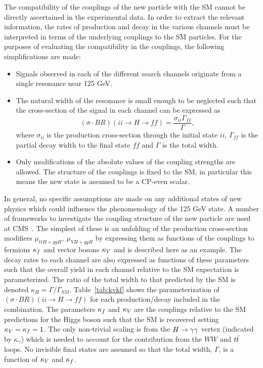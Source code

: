The compatibility of the couplings of the new particle with the SM cannot be directly ascertained 
in the experimental data. In order to extract the relevant information, the rates of production and decay in the various
channels must be interpreted in terms of the underlying couplings to the SM particles.
For the purposes of evaluating the compatibility in the couplings, the following simplifications
are made:
\begin{itemize}
\item Signals observed in each of the different search channels originate from a single
resonance near 125 GeV.
\item The natural width of the resonance is small enough to be neglected such that the 
cross-section of the signal in each channel can be expressed as
\begin{equation}
(\sigma \cdot BR)(ii\rightarrow H\rightarrow ff) 
	= \frac{\displaystyle \sigma_{ii}\Gamma_{ff}}{\displaystyle \Gamma},
\end{equation}
where $\sigma_{ii}$ is the production cross-section through the initial state $ii$, 
$\Gamma_{ff}$ is the partial decay width to the final state $ff$ and $\Gamma$ is the
total width. 
\item Only modifications of the absolute values of the coupling strengths are allowed. 
The structure of the couplings is fixed to the SM, in particular this means the 
new state is assumed to be a CP-even scalar.
\end{itemize}
In general, no specific assumptions are made on any additional states of new physics
which could influence the phenomenology of the 125 GeV state.
A number of frameworks to investigate the coupling structure of the new particle
are used at CMS~\citep{couplingsint}. The simplest of these is an unfolding of the production cross-section
modifiers $\mu_{ttH+ggH},~\mu_{VH+qqH}$ by expressing them as functions of the couplings 
to fermions $\kappa_{f}$ and vector bosons $\kappa_{V}$ and is described here as an example. 
The decay rates to each channel are also expressed as functions of these parameters such that the overall 
yield in each channel relative to the SM expectation is parameterized.
The ratio of the total width to that predicted by the SM is denoted $\kappa_{H} =\Gamma/\Gamma_{SM}$.
Table~\ref{tab:kvkf} shows the parameterization of $(\sigma \cdot BR)(ii\rightarrow H\rightarrow ff)$
for each production/decay  included in the combination. The parameters $\kappa_{f}$ and $\kappa_{V}$
are the couplings relative to the SM predictions for the Higgs boson such that the SM is recovered setting 
$\kappa_{V}=\kappa_{f}=1$. The only non-trivial scaling is from the $H\rightarrow\gamma\gamma$ vertex (indicated by $\kappa_\gamma$)
which is needed to account for the contribution from the $WW$ and $t\bar{t}$ loops.
No invisible final states are assumed so that the total width, 
$\Gamma$, is a function of $\kappa_{V}$ and $\kappa_{f}$.

